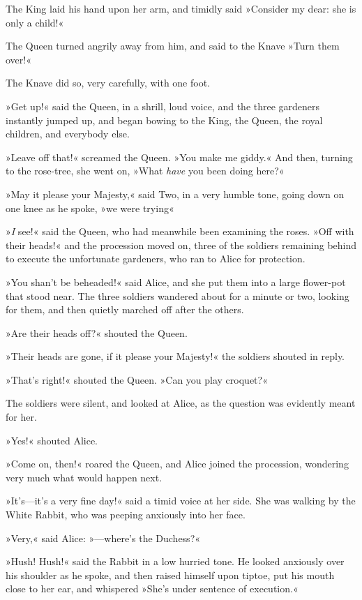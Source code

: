 The King laid his hand upon her arm, and timidly said »Consider my dear: she is only a child!«

The Queen turned angrily away from him, and said to the Knave »Turn them over!«

The Knave did so, very carefully, with one foot.

»Get up!« said the Queen, in a shrill, loud voice, and the three gardeners instantly jumped up, and began bowing to the King, the Queen, the royal children, and everybody else.

»Leave off that!« screamed the Queen. »You make me giddy.« And then, turning to the rose-tree, she went on, »What \textit{have} you been doing here?«

»May it please your Majesty,« said Two, in a very humble tone, going down on one knee as he spoke, »we were trying\longdash«


»\textit{I} see!« said the Queen, who had meanwhile been examining the roses. »Off with their heads!« and the procession moved on, three of the soldiers remaining behind to execute the unfortunate gardeners, who ran to Alice for protection.

»You shan't be beheaded!« said Alice, and she put them into a large flower-pot that stood near. The three soldiers wandered about for a minute or two, looking for them, and then quietly marched off after the others.

»Are their heads off?« shouted the Queen.

»Their heads are gone, if it please your Majesty!« the soldiers shouted in reply.

»That's right!« shouted the Queen. »Can you play croquet?«

The soldiers were silent, and looked at Alice, as the question was evidently meant for her.

»Yes!« shouted Alice.

»Come on, then!« roared the Queen, and Alice joined the procession, wondering very much what would happen next.

»It's—it's a very fine day!« said a timid voice at her side. She was walking by the White Rabbit, who was peeping anxiously into her face.

»Very,« said Alice: »—where's the Duchess?«

»Hush! Hush!« said the Rabbit in a low hurried tone. He looked anxiously over his shoulder as he spoke, and then raised himself upon tiptoe, put his mouth close to her ear, and whispered »She's under sentence of execution.«

